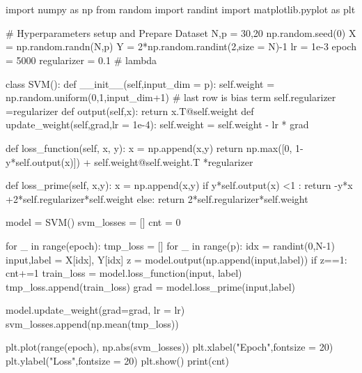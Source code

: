 \documentclass[10pt]{article}
\begin{document}
\section{}
\begin{python}
import numpy as np
from random import randint
import matplotlib.pyplot as plt

# Hyperparameters setup and Prepare Dataset
N,p = 30,20
np.random.seed(0)
X = np.random.randn(N,p)
Y = 2*np.random.randint(2,size = N)-1
lr = 1e-3
epoch = 5000
regularizer = 0.1 # lambda

class SVM():
    def __init__(self,input_dim = p):
        self.weight = np.random.uniform(0,1,input_dim+1) # last row is bias term
        self.regularizer =regularizer
    def output(self,x):
        return x.T@self.weight
    def update_weight(self,grad,lr = 1e-4):
        self.weight = self.weight - lr * grad

    def loss_function(self, x, y):
        x = np.append(x,y)
        return np.max([0, 1-y*self.output(x)]) + self.weight@self.weight.T *regularizer
    
    def loss_prime(self, x,y):
        x = np.append(x,y)
        if y*self.output(x) <1 : 
            return -y*x +2*self.regularizer*self.weight
        else:
            return 2*self.regularizer*self.weight

model = SVM()
svm_losses = []
cnt = 0

for _ in range(epoch):
    tmp_loss = []
    for _ in range(p):
        idx = randint(0,N-1)
        input,label = X[idx], Y[idx]
        z = model.output(np.append(input,label))
        if z==1:
            cnt+=1
        train_loss = model.loss_function(input, label)
        tmp_loss.append(train_loss)
        grad = model.loss_prime(input,label)
        
        model.update_weight(grad=grad, lr = lr)
    svm_losses.append(np.mean(tmp_loss))

plt.plot(range(epoch), np.abs(svm_losses))
plt.xlabel("Epoch",fontsize = 20)
plt.ylabel("Loss",fontsize = 20)
plt.show()
print(cnt)
\end{python}
\end{document}
